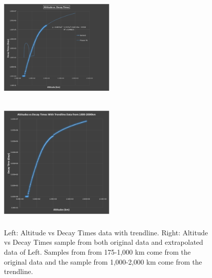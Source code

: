 \documentclass[pre,12pt]{revtex4-1}
\begin{document}
\begin{figure}[h]
\centerline{%
\includegraphics[height=6cm, width=0.5\textwidth]{"Figures/extrapolatedAltDecayTimes"}%
\includegraphics[height=6cm, width=0.5\textwidth]{"Figures/altDecayTimesWithAddedData"}%
}%
\caption{Left: Altitude vs Decay Times data with trendline. Right: Altitude vs Decay Times sample from both original data and extrapolated data of Left. Samples from from 175-1,000 km come from the original data and the sample from 1,000-2,000 km come from the trendline.}
\label{fig:altDecayTimesExtrapolated}
\end{figure}


\clearpage
\end{document}
